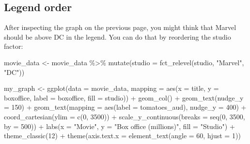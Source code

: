 \documentclass[
]{krantz}
\makeatletter
\newenvironment{Shaded}{\begin{snugshade}}{\end{snugshade}}
\newcommand{\AttributeTok}[1]{\textcolor[rgb]{0.61,0.61,0.61}{#1}}
\newcommand{\DecValTok}[1]{\textcolor[rgb]{0.06,0.06,0.06}{#1}}
\newcommand{\FunctionTok}[1]{\textcolor[rgb]{0,0,0}{#1}}
\newcommand{\NormalTok}[1]{#1}
\newcommand{\OtherTok}[1]{\textcolor[rgb]{0.37,0.37,0.37}{#1}}
\newcommand{\SpecialCharTok}[1]{\textcolor[rgb]{0,0,0}{#1}}
\newcommand{\StringTok}[1]{\textcolor[rgb]{0.5,0.5,0.5}{#1}}
\newenvironment{kframe}{%
\medskip{}
\setlength{\fboxsep}{.8em}
 \def\at@end@of@kframe{}%
 \ifinner\ifhmode%
  \def\at@end@of@kframe{\end{minipage}}%
  \begin{minipage}{\columnwidth}%
 \fi\fi%
 \def\FrameCommand##1{\hskip\@totalleftmargin \hskip-\fboxsep
 \colorbox{shadecolor}{##1}\hskip-\fboxsep
     \hskip-\linewidth \hskip-\@totalleftmargin \hskip\columnwidth}%
 \MakeFramed {\advance\hsize-\width
   \@totalleftmargin\z@ \linewidth\hsize
   \@setminipage}}%
 {\par\unskip\endMakeFramed%
 \at@end@of@kframe}
\renewenvironment{Shaded}{\begin{kframe}}{\end{kframe}}
\makeatother
\begin{document}
\hypertarget{legend-order}{%
\subsection{Legend order}\label{legend-order}}

After inspecting the graph on the previous page, you might think that Marvel should be above DC in the legend. You can do that by reordering the studio factor:

\begin{Shaded}
\begin{Highlighting}[]
\NormalTok{movie\_data }\OtherTok{\textless{}{-}}\NormalTok{ movie\_data }\SpecialCharTok{\%\textgreater{}\%} 
  \FunctionTok{mutate}\NormalTok{(}\AttributeTok{studio =} \FunctionTok{fct\_relevel}\NormalTok{(studio,}
                             \StringTok{"Marvel"}\NormalTok{,}
                             \StringTok{"DC"}\NormalTok{))}
\end{Highlighting}
\end{Shaded}

\begin{Shaded}
\begin{Highlighting}[]
\NormalTok{my\_graph }\OtherTok{\textless{}{-}} \FunctionTok{ggplot}\NormalTok{(}\AttributeTok{data =}\NormalTok{ movie\_data,}
           \AttributeTok{mapping =} \FunctionTok{aes}\NormalTok{(}\AttributeTok{x =}\NormalTok{ title,}
                         \AttributeTok{y =}\NormalTok{ boxoffice,}
                         \AttributeTok{label =}\NormalTok{ boxoffice, }
                         \AttributeTok{fill =}\NormalTok{ studio)) }\SpecialCharTok{+}
  \FunctionTok{geom\_col}\NormalTok{() }\SpecialCharTok{+}
  \FunctionTok{geom\_text}\NormalTok{(}\AttributeTok{nudge\_y =} \DecValTok{150}\NormalTok{)  }\SpecialCharTok{+}
  \FunctionTok{geom\_text}\NormalTok{(}\AttributeTok{mapping =} \FunctionTok{aes}\NormalTok{(}\AttributeTok{label =}\NormalTok{ tomatoes\_aud), }
            \AttributeTok{nudge\_y =} \DecValTok{400}\NormalTok{) }\SpecialCharTok{+}
  \FunctionTok{coord\_cartesian}\NormalTok{(}\AttributeTok{ylim =} \FunctionTok{c}\NormalTok{(}\DecValTok{0}\NormalTok{, }\DecValTok{3500}\NormalTok{)) }\SpecialCharTok{+}
  \FunctionTok{scale\_y\_continuous}\NormalTok{(}\AttributeTok{breaks =} \FunctionTok{seq}\NormalTok{(}\DecValTok{0}\NormalTok{, }\DecValTok{3500}\NormalTok{, }\AttributeTok{by =} \DecValTok{500}\NormalTok{)) }\SpecialCharTok{+}
  \FunctionTok{labs}\NormalTok{(}\AttributeTok{x =} \StringTok{"Movie"}\NormalTok{,}
       \AttributeTok{y =} \StringTok{"Box office (millions)"}\NormalTok{,}
       \AttributeTok{fill =} \StringTok{"Studio"}\NormalTok{) }\SpecialCharTok{+}
  \FunctionTok{theme\_classic}\NormalTok{(}\DecValTok{12}\NormalTok{) }\SpecialCharTok{+}
  \FunctionTok{theme}\NormalTok{(}\AttributeTok{axis.text.x =} \FunctionTok{element\_text}\NormalTok{(}\AttributeTok{angle =} \DecValTok{60}\NormalTok{, }
                                   \AttributeTok{hjust =} \DecValTok{1}\NormalTok{))  }
\end{Highlighting}
\end{Shaded}
\end{document}
